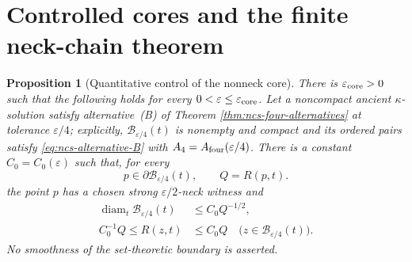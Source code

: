 \documentclass[10pt]{coll-l}
\newtheorem{proposition}[theorem]{Proposition}
\theoremstyle{definition}
\theoremstyle{remark}
\numberwithin{section}{chapter}
\numberwithin{equation}{chapter}
\begin{document}
\section{Controlled cores and the finite neck-chain theorem}
\label{sec:ncs-controlled-core}

\begin{proposition}[Quantitative control of the nonneck core]
\label{prop:ncs-bad-set-compact}
There is $\varepsilon_{\rm core}>0$ such that the following holds for every
$0<\varepsilon\leq\varepsilon_{\rm core}$.  Let a noncompact ancient
$\kappa$-solution satisfy alternative~(B) of Theorem
\ref{thm:ncs-four-alternatives} at tolerance $\varepsilon/4$; explicitly,
$\mathscr B_{\varepsilon/4}(t)$ is nonempty and compact and its ordered
pairs satisfy \eqref{eq:ncs-alternative-B} with
$A_4=A_{\rm four}(\varepsilon/4)$.  There is a constant
$C_0=C_0(\varepsilon)$ such that, for every
\begin{equation}
       p\in\partial\mathscr B_{\varepsilon/4}(t),
       \qquad Q=R(p,t).                                 \label{eq:ncs-buffered-boundary-point}
\end{equation}
the point $p$ has a chosen strong $\varepsilon/2$-neck witness and
\begin{align}
 \operatorname{diam}_t\mathscr B_{\varepsilon/4}(t)
       &\leq C_0Q^{-1/2},                               \label{eq:ncs-bad-diameter}\\
 C_0^{-1}Q\leq R(z,t)&\leq C_0Q
       \quad\bigl(z\in\mathscr B_{\varepsilon/4}(t)\bigr).  \label{eq:ncs-bad-scalar-comparison}
\end{align}
No smoothness of the set-theoretic boundary is asserted.
\end{proposition}
\end{document}

